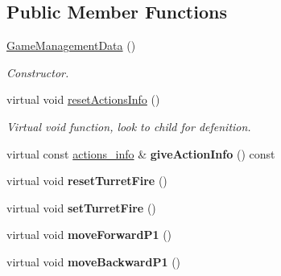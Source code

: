 \subsection*{Public Member Functions}
\begin{DoxyCompactItemize}
\item 
\hypertarget{class_game_management_data_a62ed683d4e02da56bda0507892a72041}{\hyperlink{class_game_management_data_a62ed683d4e02da56bda0507892a72041}{Game\+Management\+Data} ()}\label{class_game_management_data_a62ed683d4e02da56bda0507892a72041}

\begin{DoxyCompactList}\small\item\em Constructor. \end{DoxyCompactList}\item 
\hypertarget{class_game_management_data_ae49afd739e313caf0b5cd3799be1b125}{virtual void \hyperlink{class_game_management_data_ae49afd739e313caf0b5cd3799be1b125}{reset\+Actions\+Info} ()}\label{class_game_management_data_ae49afd739e313caf0b5cd3799be1b125}

\begin{DoxyCompactList}\small\item\em Virtual void function, look to child for defenition. \end{DoxyCompactList}\item 
\hypertarget{class_game_management_data_afa213f0d90a9d0878fae317457f5e851}{virtual const \hyperlink{structactions__info}{actions\+\_\+info} \& {\bfseries give\+Action\+Info} () const }\label{class_game_management_data_afa213f0d90a9d0878fae317457f5e851}

\item 
\hypertarget{class_game_management_data_a2e9acf1ddddabee775dc106b478aa2e2}{virtual void {\bfseries reset\+Turret\+Fire} ()}\label{class_game_management_data_a2e9acf1ddddabee775dc106b478aa2e2}

\item 
\hypertarget{class_game_management_data_aa3e5f9aaa99a44c4518933ad75b7ccd6}{virtual void {\bfseries set\+Turret\+Fire} ()}\label{class_game_management_data_aa3e5f9aaa99a44c4518933ad75b7ccd6}

\item 
\hypertarget{class_game_management_data_a4ad4fccb78261b8299142db3185828e3}{virtual void {\bfseries move\+Forward\+P1} ()}\label{class_game_management_data_a4ad4fccb78261b8299142db3185828e3}

\item 
\hypertarget{class_game_management_data_ab023b818d0ffc740fc5574654ff89cfa}{virtual void {\bfseries move\+Backward\+P1} ()}\label{class_game_management_data_ab023b818d0ffc740fc5574654ff89cfa}


\end{DoxyCompactItemize}
